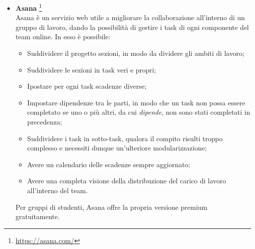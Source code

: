 \begin{itemize}
\item \textbf{Asana} \footnote{\href{https://asana.com/}{https://asana.com/}}
	~\\Asana è un servizio web utile a migliorare la collaborazione all'interno di un gruppo di lavoro, dando la possibilità di gestire i task di ogni componente del team online. 
In esso è possibile:
\begin{itemize}
\item Suddividere il progetto sezioni, in modo da dividere gli ambiti di lavoro;
\item Suddividere le sezioni in task veri e propri;
\item Ipostare per ogni task scadenze diverse; 
\item Impostare dipendenze tra le parti, in modo che un task non possa essere completato se uno o più altri, da cui \emph{dipende}, non sono stati completati in precedenza;
\item Suddividere i task in sotto-task, qualora il compito risulti troppo complesso e necessiti dunque un'ulteriore modularizzazione;
\item Avere un calendario delle scadenze sempre aggiornato;
\item Avere una completa visione della distribuzione del carico di lavoro all'interno del team.
\end{itemize}
Per gruppi di studenti, Asana offre la propria versione premium gratuitamente.
\end{itemize}


	